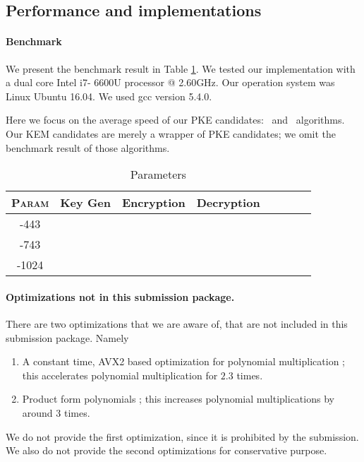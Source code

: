 \documentclass{llncs}
\newcommand{\ntru}{{\sf{NTRU}}}
\newcommand{\ntrupke}{{\sf{ntru-pke}}}
\newcommand{\ssntrupke}{{\sf{ss-ntru-pke}}}
\newcommand{\<}{\langle}
\renewcommand{\>}{\rangle}
\begin{document}
\subsection{Performance and implementations}
\paragraph{Benchmark}
We present the benchmark result in Table \ref{tab:bench}.
We tested our implementation with a dual core Intel i7-
6600U processor @ 2.60GHz. Our operation system was
Linux Ubuntu 16.04. We used gcc version 5.4.0.

Here we focus on the average speed of our 
PKE candidates: \ntrupke~and \ssntrupke~algorithms. Our KEM candidates are merely a 
wrapper of PKE candidates; we omit the benchmark result 
of those algorithms.
\begin{table}
\centering
\caption{Parameters}
\label{tab:bench}
\begin{tabular}{|c|c|c|c|c|c|c|c|}\hline
\textsc{Param} &Key Gen & Encryption & Decryption\\\hline\hline
\ntru-443 & & & \\%
\ntru-743 & & &\\%
\ntru-1024 & & &\\\hline
\end{tabular}
\end{table}


\paragraph{Optimizations not in this submission package.}
There are two optimizations that we are aware of, that are not 
included in this submission package. Namely
\begin{enumerate}
\item A constant time, AVX2 based optimization for polynomial multiplication \cite{ntrutoc}; this accelerates polynomial multiplication for $2.3$ times.
\item Product form polynomials \cite{DBLP:conf/ctrsa/HoffsteinPSSWZ17}; this increases 
polynomial multiplications by around 3 times.
\end{enumerate}
We do not provide the first optimization, since it is prohibited
by the submission. We also do not provide the second optimizations
for conservative purpose. 
\end{document}
